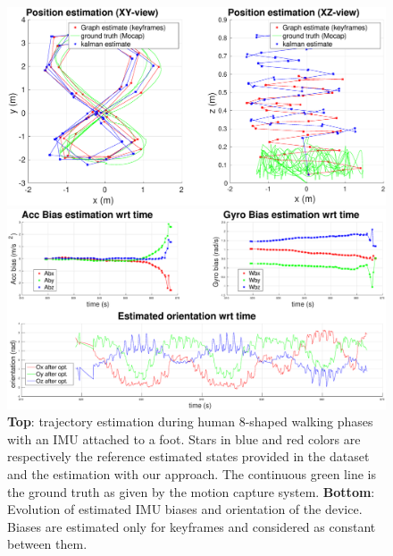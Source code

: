 \begin{figure}[tb]
\centering
\includegraphics[scale=0.175]{figures/experiments/8shape/XY_XZ_viewsRotated.eps}
\par\vspace{4mm}
\includegraphics[scale=0.175]{figures/experiments/8shape/bias_orientation.eps}
\caption{ 
{\bf Top}: trajectory estimation during human 8-shaped walking phases with an IMU attached to a foot. Stars in blue and red colors are respectively the reference estimated states provided in the dataset and the estimation with our approach.
The continuous green line is the ground truth as given by the motion capture system.
{\bf Bottom}: Evolution of estimated IMU biases and orientation of the device. Biases are estimated only for keyframes and considered as constant between them. 
}
\label{fig:8shape_walk}
\end{figure}




